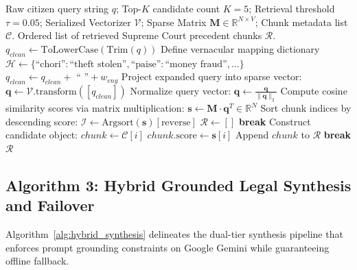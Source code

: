 \begin{algorithm}[H]
\caption{Calibrated Cosine Similarity Precedent Retrieval with Vernacular Expansion}
\label{alg:cosine_retrieval}
\begin{algorithmic}[1]
\Require Raw citizen query string $q$; Top-$K$ candidate count $K = 5$; Retrieval threshold $\tau = 0.05$; Serialized Vectorizer $\mathcal{V}$; Sparse Matrix $\mathbf{M} \in \mathbb{R}^{N \times V}$; Chunk metadata list $\mathcal{C}$.
\Ensure Ordered list of retrieved Supreme Court precedent chunks $\mathcal{R}$.
\State $q_{clean} \leftarrow \text{ToLowerCase}(\text{Trim}(q))$
\State Define vernacular mapping dictionary $\mathcal{H} \leftarrow \{\text{``chori''}: \text{``theft stolen''}, \text{``paise''}: \text{``money fraud''}, \dots\}$
        \State $q_{clean} \leftarrow q_{clean} + \text{ `` ''} + w_{eng}$ 
    \EndIf
\EndFor
\State Project expanded query into sparse vector: $\mathbf{q} \leftarrow \mathcal{V}.\text{transform}([q_{clean}])$
\State Normalize query vector: $\mathbf{q} \leftarrow \frac{\mathbf{q}}{\|\mathbf{q}\|_2}$
\State Compute cosine similarity scores via matrix multiplication:
\State $\mathbf{s} \leftarrow \mathbf{M} \cdot \mathbf{q}^T \in \mathbb{R}^N$ 
\State Sort chunk indices by descending score: $\mathcal{I} \leftarrow \text{Argsort}(\mathbf{s})[\text{reverse}]$
\State $\mathcal{R} \leftarrow []$
        \State \textbf{break} 
    \EndIf
    \State Construct candidate object:
    \State $chunk \leftarrow \mathcal{C}[i]$
    \State $chunk.\text{score} \leftarrow \mathbf{s}[i]$
    \State Append $chunk$ to $\mathcal{R}$
        \State \textbf{break}
    \EndIf
\EndFor
\State \Return $\mathcal{R}$
\end{algorithmic}
\end{algorithm}

\subsection{Algorithm 3: Hybrid Grounded Legal Synthesis and Failover}
Algorithm~\ref{alg:hybrid_synthesis} delineates the dual-tier synthesis pipeline that enforces prompt grounding constraints on Google Gemini while guaranteeing offline fallback.

